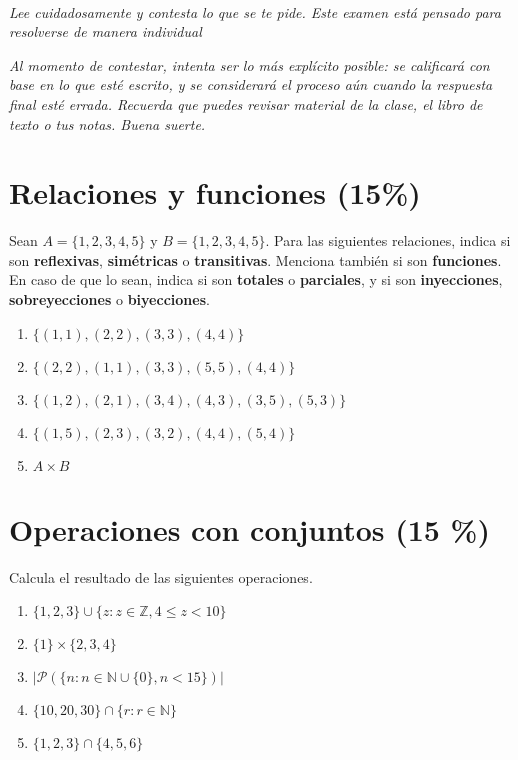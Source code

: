 \documentclass{article}
\title{
    \myclass \\
    \textbf{\mytitle} \\
    \myheader
    \date{}
}
\begin{document}
\maketitle

\vspace{-1.5cm}

{%
\footnotesize
\textit{Lee cuidadosamente y contesta lo que se te pide.
Este examen está pensado para resolverse de manera individual}

\textit{Al momento de contestar, intenta ser lo más explícito posible: se calificará con base en lo que esté escrito, y se considerará el proceso aún cuando la respuesta final esté errada.
Recuerda que puedes revisar material de la clase, el libro de texto o tus notas.
Buena suerte.}
}

\section{Relaciones y funciones (15\%)}

Sean $A = \{1,2,3,4,5\}$ y $B = \{1,2,3,4,5\}$.
Para las siguientes relaciones, indica si son \textbf{reflexivas}, \textbf{simétricas} o \textbf{transitivas}.
Menciona también si son \textbf{funciones}. En caso de que lo sean, indica si son \textbf{totales} o \textbf{parciales}, y si son \textbf{inyecciones}, \textbf{sobreyecciones} o \textbf{biyecciones}.

\begin{enumerate}[label=\tt \alph*)]
    \itemsep0em
    \item $\{(1,1), (2,2), (3,3), (4,4)\}$
    \item $\{(2,2), (1,1), (3,3), (5,5), (4,4)\}$
    \item $\{(1,2), (2,1), (3,4), (4,3), (3,5), (5,3)\}$
    \item $\{(1,5), (2,3), (3,2), (4,4), (5, 4)\}$
    \item $A \times B$
\end{enumerate}


\section{Operaciones con conjuntos (15 \%)}

Calcula el resultado de las siguientes operaciones.

\begin{enumerate}[label=\tt \alph*)]
    \itemsep0em
    \item $\{1, 2, 3\} \cup \{z : z \in \mathbb{Z}, 4 \leq z < 10 \}$
    \item $\{1\} \times \{2,3,4\}$
    \item $|\mathscr{P}(\{n : n \in \mathbb{N} \cup \{0\}, n < 15\})|$
    \item $\{10, 20, 30\} \cap \{r : r \in \mathbb{N}\}$
    \item $\{1, 2, 3\} \cap \{4, 5, 6\}$
\end{enumerate}
\end{document}
